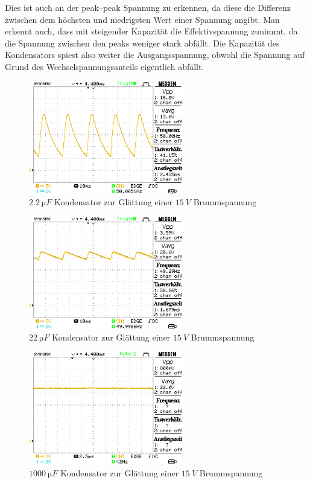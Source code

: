 \documentclass[a4paper,10pt]{article}
\numberwithin{equation}{section}
\begin{document}
Dies ist auch an der peak--peak Spannung zu erkennen, da diese die Differenz zwischen dem höchsten und niedrigsten Wert einer Spannung angibt.
Man erkennt auch, dass mit steigender Kapazität die Effektivspannung zunimmt, da die Spannung zwischen den peaks weniger stark abfällt.
Die Kapazität des Kondensators spiest also weiter die Ausgangsspannung, obwohl die Spannung auf Grund des Wechselspannungsanteils eigentlich abfällt.
\begin{figure}[h]
        \centering
        \includegraphics[width=0.6\textwidth]{data/a3_b.BMP.png}
        \caption{$\SI{2.2}{\micro F}$ Kondensator zur Glättung einer $\SI{15}{V}$ Brummspannung}
\end{figure}
\begin{figure}[h]
        \centering
        \includegraphics[width=0.6\textwidth]{data/a3_c.BMP.png}
        \caption{$\SI{22}{\micro F}$ Kondensator zur Glättung einer $\SI{15}{V}$ Brummspannung}
\end{figure}
\begin{figure}[h]
        \centering
        \includegraphics[width=0.6\textwidth]{data/a3_d.BMP.png}
        \caption{$\SI{1000}{\micro F}$ Kondensator zur Glättung einer $\SI{15}{V}$ Brummspannung}
\end{figure}
\clearpage
\end{document}
